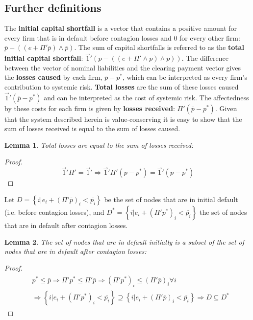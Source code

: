 \documentclass[12pt,a4paper]{article}
\newtheorem{lemma}{Lemma}
\begin{document}
\subsection{Further definitions}
The \textbf{initial capital shortfall} is a vector that contains a positive amount for every firm that is in default before contagion losses and $0$ for every other firm: $\bar{p}-((e+\Pi'\bar{p})\wedge \bar{p})$. The sum of capital shortfalls is referred to as the \textbf{total initial capital shortfall}: $\vec{1}' (\bar{p}-((e+\Pi' \wedge \bar{p})\wedge \bar{p}))$. The difference between the vector of nominal liabilities and the clearing payment vector gives the \textbf{losses caused} by each firm, $\bar{p}-p^*$, which can be interpreted as every firm’s contribution to systemic risk. \textbf{Total losses} are the sum of these losses caused $\vec{1}' (\bar{p}-p^* )$ and can be interpreted as the cost of systemic risk. The affectedness by these costs for each firm is given by \textbf{losses received}: $\Pi' (\bar{p}-p^* )$. Given that the system described herein is value-conserving it is easy to show that the sum of losses received is equal to the sum of losses caused.

\begin{lemma} \label{lem:totlosses}
Total losses are equal to the sum of losses received: \end{lemma}
\begin{proof}\[
\vec{1}' \Pi'=\vec{1}' \Rightarrow \vec{1}' \Pi' (\bar{p}-p^* )=\vec{1}'(\bar{p}-p^* )
\] \end{proof}


Let $D=\left\{ {i\vert e_i+(\Pi'\bar{p})_i<\bar{p_i} } \right\}$ be the set of nodes that are in initial default (i.e. before contagion losses), and $D^*=\left\{ {i\vert e_i+(\Pi'p^* )_i<\bar{p_i} } \right\}$ the set of nodes that are in default after contagion losses. 

\begin{lemma} \label{lem:defaultset}
The set of nodes that are in default initially is a subset of the set of nodes that are in default after contagion losses:
\end{lemma}
\begin{proof}
\begin{align*}
\begin{split}
& p^* \le \bar{p} \Rightarrow \Pi'p^* \le \Pi'\bar{p} \Rightarrow (\Pi'p^*)_i \le (\Pi'\bar{p})_i \forall i \\
& \Rightarrow \left\{ {i\vert e_i+(\Pi'p^* )_i<\bar{p_i} } \right\} \supseteq \left\{ {i\vert e_i+(\Pi'\bar{p})_i<\bar{p_i} } \right\}
\Rightarrow D\subseteq D^*
\end{split}
\end{align*}
\end{proof}
\end{document}
